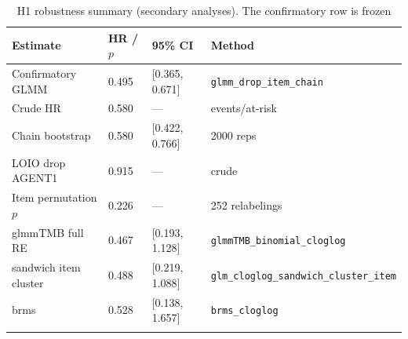 \begin{table}[t]
\centering
\caption{H1 robustness summary (secondary analyses). The confirmatory row is frozen}
\label{tab:h1_robustness}
\begin{tabular}{llll}
\toprule
Estimate & HR / $p$ & 95\% CI & Method \\
\midrule
Confirmatory GLMM & 0.495 & [0.365, 0.671] & \texttt{glmm\_drop\_item\_chain} \\
Crude HR & 0.580 & --- & events/at-risk \\
Chain bootstrap & 0.580 & [0.422, 0.766] & 2000 reps \\
LOIO drop AGENT1 & 0.915 & --- & crude \\
Item permutation $p$ & 0.226 & --- & 252 relabelings \\
glmmTMB full RE & 0.467 & [0.193, 1.128] & \texttt{glmmTMB\_binomial\_cloglog} \\
sandwich item cluster & 0.488 & [0.219, 1.088] & \texttt{glm\_cloglog\_sandwich\_cluster\_item} \\
brms & 0.528 & [0.138, 1.657] & \texttt{brms\_cloglog} \\
\botrule
\end{tabular}
\end{table}
